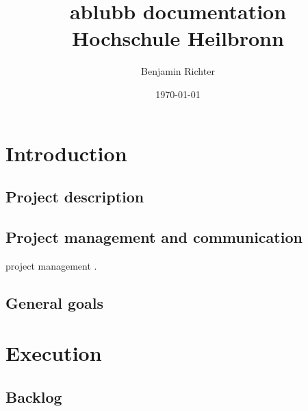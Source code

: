 \documentclass[12pt,a4paper,oneside]{report}
\newcommand{\appname}{ablubb}
\begin{document}
%
\title{
	{\huge \appname{} documentation}
	{\\ \large Hochschule Heilbronn}
}
\author{Benjamin Richter}
\date{\today}
\maketitle
\tableofcontents

\chapter{Introduction}

\section{Project description}

\section{Project management and communication}
project management \citep{mihaela2013measurement}. 


\section{General goals}


\chapter{Execution}

\section{Backlog}
\end{document}
